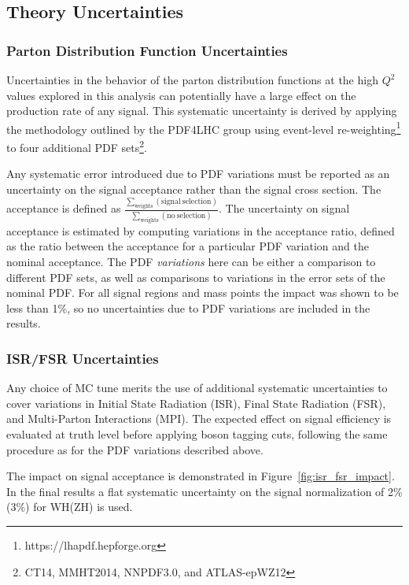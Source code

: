\subsection{Theory Uncertainties}

\subsubsection{Parton Distribution Function Uncertainties}
\label{sec:pdf_unc}
Uncertainties in the behavior of the parton distribution functions at the high $Q^2$ values explored in this analysis can potentially have a large effect on the production rate of any signal.
This systematic uncertainty is derived by applying the methodology outlined by the PDF4LHC group using event-level re-weighting\footnote{https://lhapdf.hepforge.org} to four additional PDF sets\footnote{CT14, MMHT2014, NNPDF3.0, and ATLAS-epWZ12}.

Any systematic error introduced due to PDF variations must be reported as an uncertainty on the signal acceptance rather than the signal cross section. The acceptance is defined as
$\frac{\sum_{\mathrm{weights}} (\mathrm{signal\ selection})}{\sum_{\mathrm{weights}} (\mathrm{no\ selection})}$.
The uncertainty on signal acceptance is estimated by computing variations in the acceptance ratio, defined as the ratio between the acceptance for a particular PDF variation and the nominal acceptance.
The PDF \textit{variations} here can be either a comparison to different PDF sets, as well as comparisons to variations in the error sets of the nominal PDF.
For all signal regions and mass points the impact was shown to be less than 1\%, so no uncertainties due to PDF variations are included in the results.

\subsubsection{ISR/FSR Uncertainties}

Any choice of MC tune merits the use of additional systematic uncertainties to cover variations in Initial State Radiation (ISR), Final State Radiation (FSR), and Multi-Parton Interactions (MPI).
The expected effect on signal efficiency is evaluated at truth level before applying boson tagging cuts, following the same procedure as for the PDF variations described above.

The impact on signal acceptance is demonstrated in Figure~\ref{fig:isr_fsr_impact}.
In the final results a flat systematic uncertainty on the signal normalization of 2\%(3\%) for WH(ZH) is used.

